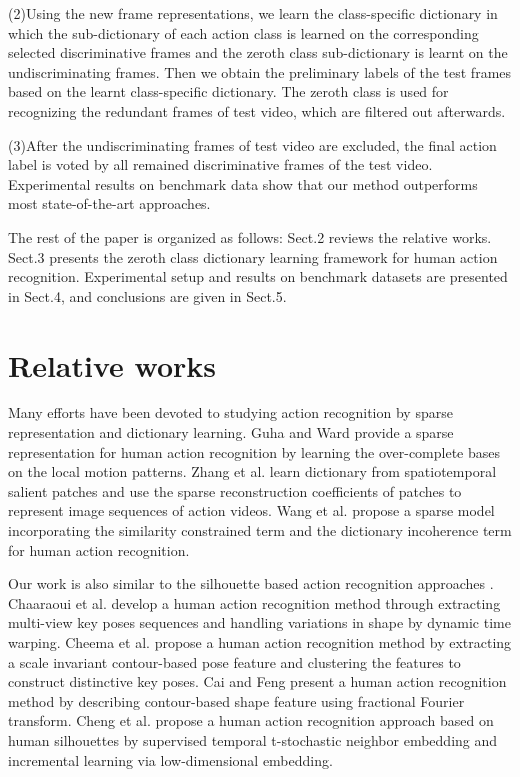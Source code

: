 \documentclass{article}
\begin{document}
(2)Using the new frame representations, we learn the class-specific dictionary in which the sub-dictionary of each action class is learned on the corresponding selected discriminative frames and the zeroth class sub-dictionary is learnt on the undiscriminating frames.
Then we obtain the preliminary labels of the test frames based on the learnt class-specific dictionary.
The zeroth class is used for recognizing the redundant frames of  test video, which are filtered out afterwards.

(3)After the undiscriminating frames of  test video are excluded, the final action label is voted by all remained discriminative frames of the test video.
Experimental results on benchmark data show that our method outperforms most state-of-the-art approaches.

The rest of the paper is organized as follows:
Sect.2 reviews the relative works.
Sect.3 presents the zeroth class dictionary learning framework
for human action recognition.
Experimental setup and results on
benchmark datasets are presented in Sect.4, and conclusions
are given in Sect.5.


\section{Relative works}
Many efforts \cite{Guha,ZhangICIP2015,Wang20123902} have been devoted to  studying  action recognition by sparse representation  and dictionary learning.
Guha and Ward \cite{Guha} provide a sparse representation for human action recognition by learning the over-complete bases on the local motion patterns.
Zhang et al.  \cite{ZhangICIP2015} learn dictionary from spatiotemporal salient patches and use the  sparse reconstruction coefficients  of patches to represent image sequences of action videos.
Wang et al. \cite{Wang20123902} propose a  sparse model incorporating the similarity constrained term and the dictionary incoherence term  for human action recognition.







Our work is also similar to the silhouette based action recognition approaches \cite{Chaaraoui2013,Cheema,frftacpr2015,ChengTIP2015}.
Chaaraoui et al. \cite{Chaaraoui2013} develop a human action recognition method through extracting multi-view key poses sequences and  handling variations in shape by dynamic time warping.
Cheema et al. \cite{Cheema}  propose a human action recognition method by extracting  a scale invariant contour-based pose feature  and  clustering  the features to construct distinctive key poses.
Cai and Feng \cite{frftacpr2015} present a human action recognition  method by describing contour-based shape feature using fractional Fourier transform.
Cheng  et al. \cite{ChengTIP2015} propose a human action recognition approach based on human silhouettes by supervised temporal t-stochastic neighbor embedding and incremental learning via low-dimensional embedding.
\end{document}

